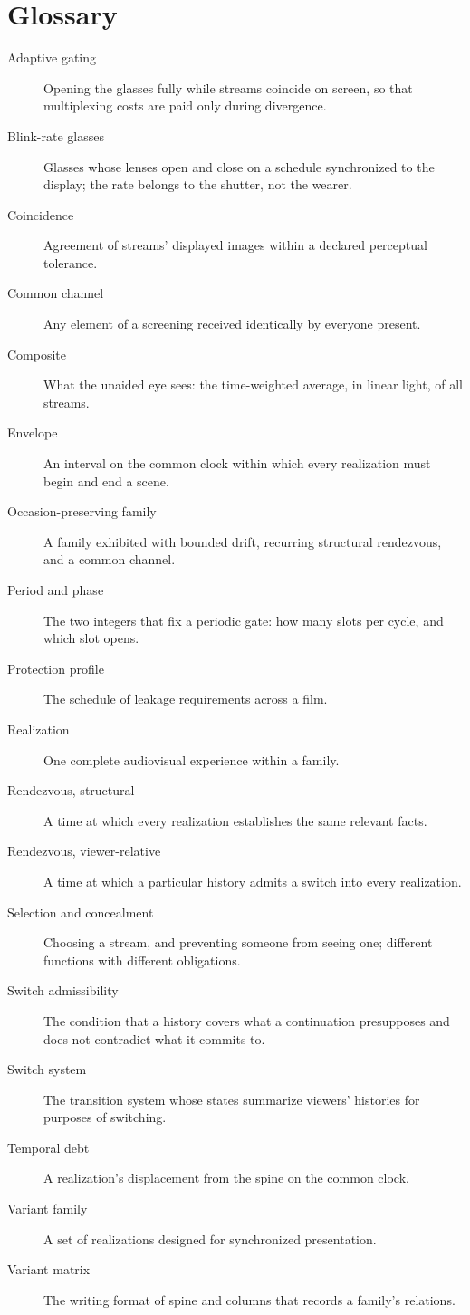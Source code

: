 \chapter{Glossary}\label{app:glossary}

\begin{description}
\item[Adaptive gating] Opening the glasses fully while streams coincide on screen, so that multiplexing costs are paid only during divergence.
\item[Blink-rate glasses] Glasses whose lenses open and close on a schedule synchronized to the display; the rate belongs to the shutter, not the wearer.
\item[Coincidence] Agreement of streams' displayed images within a declared perceptual tolerance.
\item[Common channel] Any element of a screening received identically by everyone present.
\item[Composite] What the unaided eye sees: the time-weighted average, in linear light, of all streams.
\item[Envelope] An interval on the common clock within which every realization must begin and end a scene.
\item[Occasion-preserving family] A family exhibited with bounded drift, recurring structural rendezvous, and a common channel.
\item[Period and phase] The two integers that fix a periodic gate: how many slots per cycle, and which slot opens.
\item[Protection profile] The schedule of leakage requirements across a film.
\item[Realization] One complete audiovisual experience within a family.
\item[Rendezvous, structural] A time at which every realization establishes the same relevant facts.
\item[Rendezvous, viewer-relative] A time at which a particular history admits a switch into every realization.
\item[Selection and concealment] Choosing a stream, and preventing someone from seeing one; different functions with different obligations.
\item[Switch admissibility] The condition that a history covers what a continuation presupposes and does not contradict what it commits to.
\item[Switch system] The transition system whose states summarize viewers' histories for purposes of switching.
\item[Temporal debt] A realization's displacement from the spine on the common clock.
\item[Variant family] A set of realizations designed for synchronized presentation.
\item[Variant matrix] The writing format of spine and columns that records a family's relations.
\end{description}

